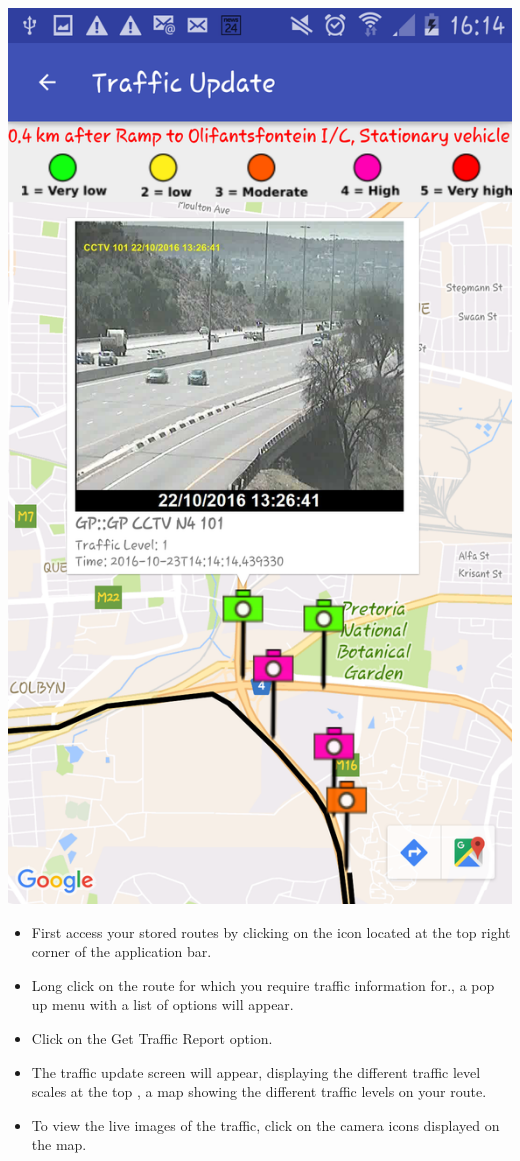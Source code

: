 \documentclass[a4paper,12pt]{article}
\begin{document}
\includegraphics[width=\textwidth]{images/TrafficReport4.png}
\begin{itemize}
    \item First access your stored routes by  clicking on the icon located at the top right corner of the application bar. 
    \item Long click on the route for which you require traffic information for., a pop up menu with a list of options will appear.
    \item Click on the Get Traffic Report option.
    \item The traffic update screen will appear, displaying the different traffic level scales at the top , a map showing the different   traffic levels on your route. 
    \item To view the live images of the traffic, click on the camera icons displayed on the map.
\end{itemize}
\end{document}
